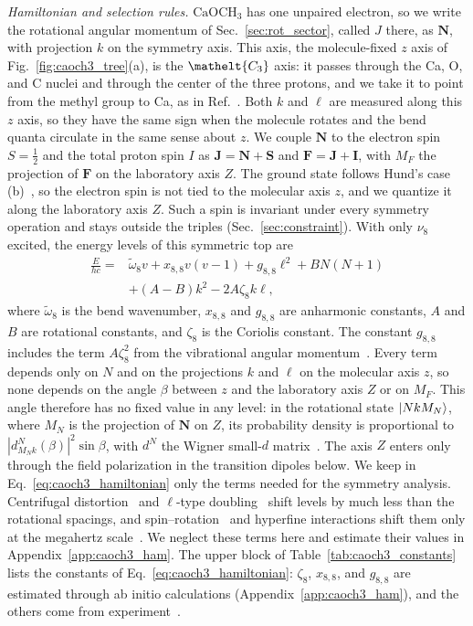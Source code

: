 \documentclass[
  reprint,
  aps,
  prx,
  superscriptaddress,
  amsmath,
  amssymb,
  longbibliography
]{revtex4-2}
\newcommand{\eltfont}[1]{{\let\sigma\eltsigma\mathelt{#1}}}
\newcommand{\elt}[1]{\eltfont{#1}}
\begin{document}
\emph{Hamiltonian and selection rules.} $\mathrm{CaOCH_3}$ has one unpaired electron, so we write the rotational angular momentum of Sec.~\ref{sec:rot_sector}, called $J$ there, as $\mathbf N$, with projection $k$ on the symmetry axis. This axis, the molecule-fixed $z$ axis of Fig.~\ref{fig:caoch3_tree}(a), is the $\elt{C_{3}}$ axis: it passes through the Ca, O, and C nuclei and through the center of the three protons, and we take it to point from the methyl group to Ca, as in Ref.~\cite{Mitra2020}. Both $k$ and $\ell$ are measured along this $z$ axis, so they have the same sign when the molecule rotates and the bend quanta circulate in the same sense about $z$. We couple $\mathbf N$ to the electron spin $S=\tfrac12$ and the total proton spin $I$ as $\mathbf J=\mathbf N+\mathbf S$ and $\mathbf F=\mathbf J+\mathbf I$, with $M_F$ the projection of $\mathbf F$ on the laboratory axis $Z$. The ground state follows Hund's case (b)~\cite{Whitham1998,Crozet2002}, so the electron spin is not tied to the molecular axis $z$, and we quantize it along the laboratory axis $Z$. Such a spin is invariant under every symmetry operation and stays outside the triples (Sec.~\ref{sec:constraint}). With only $\nu_8$ excited, the energy levels of this symmetric top are~\cite{JohnstonDennison1935,Herzberg1945,Nielsen1951,BunkerJensen2006}
\begin{align}
\frac{E}{hc}={}&\tilde\omega_8v+x_{8,8}v(v-1)+g_{8,8}\ell^2+BN(N+1)\nonumber\\
&+(A-B)k^2-2A\zeta_8k\ell ,
\label{eq:caoch3_hamiltonian}
\end{align}
where $\tilde\omega_8$ is the bend wavenumber, $x_{8,8}$ and $g_{8,8}$ are anharmonic constants, $A$ and $B$ are rotational constants, and $\zeta_8$ is the Coriolis constant. The constant $g_{8,8}$ includes the term $A\zeta_8^2$ from the vibrational angular momentum~\cite{Watson1968}. Every term depends only on $N$ and on the projections $k$ and $\ell$ on the molecular axis $z$, so none depends on the angle $\beta$ between $z$ and the laboratory axis $Z$ or on $M_F$. This angle therefore has no fixed value in any level: in the rotational state $\ket{NkM_N}$, where $M_N$ is the projection of $\mathbf N$ on $Z$, its probability density is proportional to $|d^N_{M_Nk}(\beta)|^2\sin\beta$, with $d^N$ the Wigner small-$d$ matrix~\cite{Zare1988}. The axis $Z$ enters only through the field polarization in the transition dipoles below. We keep in Eq.~\eqref{eq:caoch3_hamiltonian} only the terms needed for the symmetry analysis. Centrifugal distortion~\cite{Herzberg1945,Crozet2002} and $\ell$-type doubling~\cite{Nielsen1951} shift levels by much less than the rotational spacings, and spin--rotation~\cite{VanVleck1951,Raynes1964,Hirota1985} and hyperfine interactions shift them only at the megahertz scale~\cite{Namiki1998,Mitra2020,Yu2019}. We neglect these terms here and estimate their values in Appendix~\ref{app:caoch3_ham}. The upper block of Table~\ref{tab:caoch3_constants} lists the constants of Eq.~\eqref{eq:caoch3_hamiltonian}: $\zeta_8$, $x_{8,8}$, and $g_{8,8}$ are estimated through ab initio calculations (Appendix~\ref{app:caoch3_ham}), and the others come from experiment~\cite{Crozet2002,Namiki1998,Kozyryev2019}.
\end{document}
